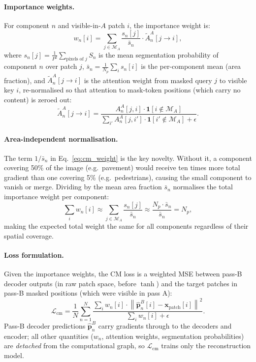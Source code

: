 \documentclass{article}
\newcommand{\bx}{\mathbf{x}}
\newcommand{\bp}{\mathbf{p}}
\begin{document}
\paragraph{Importance weights.}
For component $n$ and visible-in-$A$ patch $i$, the importance weight is:
\begin{equation}
  w_n[i] = \sum_{j \in \mathcal{M}_A}
  \frac{s_n[j]}{\bar{s}_n} \cdot \tilde{A}_n^A[j \to i],
  \label{eq:cm_weight}
\end{equation}
where $s_n[j] = \frac{1}{P^2}\sum_{\text{pixels of }j} S_n$ is the mean
segmentation probability of component $n$ over patch $j$, $\bar{s}_n =
\frac{1}{N_p}\sum_i s_n[i]$ is the per-component mean (area fraction), and
$\tilde{A}_n^A[j \to i]$ is the attention weight from masked query $j$ to
visible key $i$, re-normalised so that attention to mask-token positions (which
carry no content) is zeroed out:
\begin{equation}
  \tilde{A}_n^A[j \to i] = \frac{A_n^A[j,i] \cdot \mathbf{1}[i \notin \mathcal{M}_A]}
  {\sum_{i'} A_n^A[j,i'] \cdot \mathbf{1}[i' \notin \mathcal{M}_A] + \epsilon}.
\end{equation}

\paragraph{Area-independent normalisation.}
The term $1/\bar{s}_n$ in Eq.~\ref{eq:cm_weight} is the key novelty.  Without it,
a component covering 50\% of the image (e.g.\ pavement) would receive ten times
more total gradient than one covering 5\% (e.g.\ pedestrians), causing the small
component to vanish or merge.  Dividing by the mean area fraction $\bar{s}_n$
normalises the total importance weight per component:
\begin{equation}
  \sum_{i} w_n[i] \approx \sum_{j \in \mathcal{M}_A} \frac{s_n[j]}{\bar{s}_n}
  \approx \frac{N_p \cdot \bar{s}_n}{\bar{s}_n} = N_p,
\end{equation}
making the expected total weight the same for all components regardless of their
spatial coverage.

\paragraph{Loss formulation.}
Given the importance weights, the CM loss is a weighted MSE between pass-B
decoder outputs (in raw patch space, before $\tanh$) and the target patches in
pass-B masked positions (which were visible in pass A):
\begin{equation}
  \mathcal{L}_\mathrm{cm} = \frac{1}{N} \sum_{n=1}^{N}
  \frac{\sum_{i} w_n[i] \cdot \left\|\hat{\bp}_n^B[i] - \bx_\mathrm{patch}[i]\right\|^2}
  {\sum_{i} w_n[i] + \epsilon}.
  \label{eq:cmloss}
\end{equation}
Pass-B decoder predictions $\hat{\bp}_n^B$ carry gradients through to the decoders
and encoder; all other quantities ($w_n$, attention weights, segmentation
probabilities) are \emph{detached} from the computational graph, so
$\mathcal{L}_\mathrm{cm}$ trains only the reconstruction model.
\end{document}

